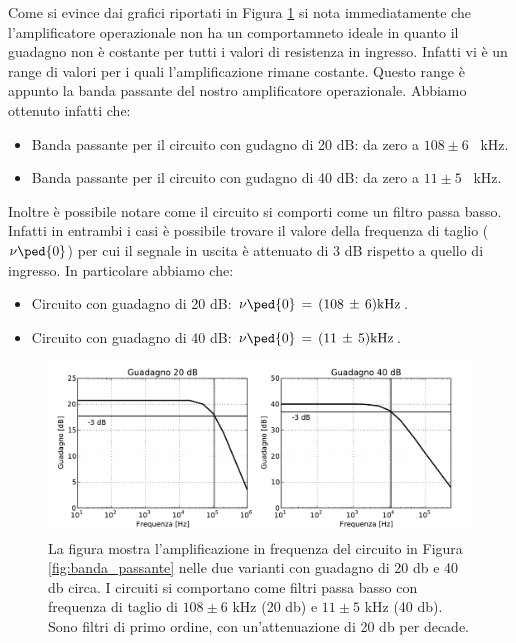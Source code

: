 Come si evince dai grafici riportati in Figura \ref{fig:DB_plot} si nota immediatamente che l'amplificatore operazionale non ha un comportamneto ideale in quanto il guadagno non è costante per tutti i valori di resistenza in ingresso. Infatti vi è un range di valori per i quali l'amplificazione rimane costante. Questo range è appunto la banda passante del nostro amplificatore operazionale. Abbiamo ottenuto infatti che:
\begin{itemize}\itemsep2pt \parskip0pt 
    \item{Banda passante per il circuito con gudagno di 20 dB: da zero a $108 \pm 6$ \SI{}{\kilo\hertz}.}
    \item{Banda passante per il circuito con gudagno di 40 dB: da zero a $11 \pm 5$ \SI{}{\kilo\hertz}.}
\end{itemize}
Inoltre è possibile notare come il circuito si comporti come un filtro passa basso. Infatti in entrambi i casi è possibile trovare il valore della frequenza di taglio ($\nu\ped{0}$) per cui il segnale in uscita è attenuato di 3 dB rispetto a quello di ingresso. In particolare abbiamo che:
\begin{itemize}\itemsep2pt \parskip0pt 
    \item{Circuito con guadagno di 20 dB: $\nu\ped{0}\,=\,(108\,\pm\,6)\SI{}{\kilo\hertz}$.}
    \item{Circuito con guadagno di 40 dB: $\nu\ped{0}\,=\,(11\,\pm\,5)\SI{}{\kilo\hertz}$.}
\end{itemize}

\begin{figure}[H]
    \includegraphics[width=\textwidth]{Figure/freq_ris.pdf}
    \caption{La figura mostra l'amplificazione in frequenza del circuito in Figura \ref{fig:banda_passante} nelle due varianti con guadagno di 20 db e 40 db circa. I circuiti si comportano come filtri passa basso con frequenza di taglio di $108 \pm 6$ kHz (20 db) e $11 \pm 5$ kHz (40 db). Sono filtri di primo ordine, con un'attenuazione di 20 db per decade.}
    \label{fig:DB_plot}
\end{figure}

